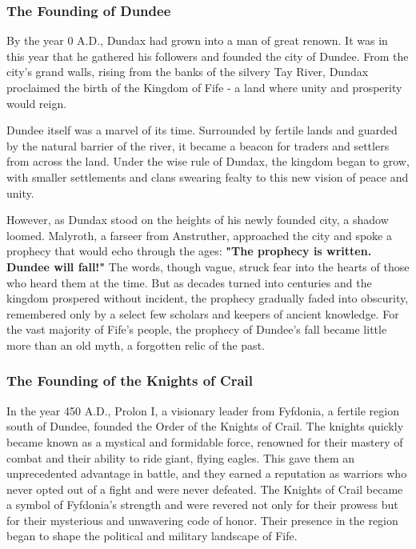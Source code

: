 \subsubsection*{The Founding of Dundee}
{\entryfont By the year 0 A.D., Dundax had grown into a man of great renown. It was in this year that he gathered his followers and founded the city of Dundee. From the city's grand walls, rising from the banks of the silvery Tay River, Dundax proclaimed the birth of the Kingdom of Fife - a land where unity and prosperity would reign.

Dundee itself was a marvel of its time. Surrounded by fertile lands and guarded by the natural barrier of the river, it became a beacon for traders and settlers from across the land. Under the wise rule of Dundax, the kingdom began to grow, with smaller settlements and clans swearing fealty to this new vision of peace and unity.

However, as Dundax stood on the heights of his newly founded city, a shadow loomed. Malyroth, a farseer from Anstruther, approached the city and spoke a prophecy that would echo through the ages: \textbf{"The prophecy is written. Dundee will fall!"} The words, though vague, struck fear into the hearts of those who heard them at the time. But as decades turned into centuries and the kingdom prospered without incident, the prophecy gradually faded into obscurity, remembered only by a select few scholars and keepers of ancient knowledge. For the vast majority of Fife's people, the prophecy of Dundee's fall became little more than an old myth, a forgotten relic of the past.}

\subsubsection*{The Founding of the Knights of Crail}
{\entryfont In the year 450 A.D., Prolon I, a visionary leader from Fyfdonia, a fertile region south of Dundee, founded the Order of the Knights of Crail. The knights quickly became known as a mystical and formidable force, renowned for their mastery of combat and their ability to ride giant, flying eagles. This gave them an unprecedented advantage in battle, and they earned a reputation as warriors who never opted out of a fight and were never defeated. The Knights of Crail became a symbol of Fyfdonia's strength and were revered not only for their prowess but for their mysterious and unwavering code of honor. Their presence in the region began to shape the political and military landscape of Fife.}

